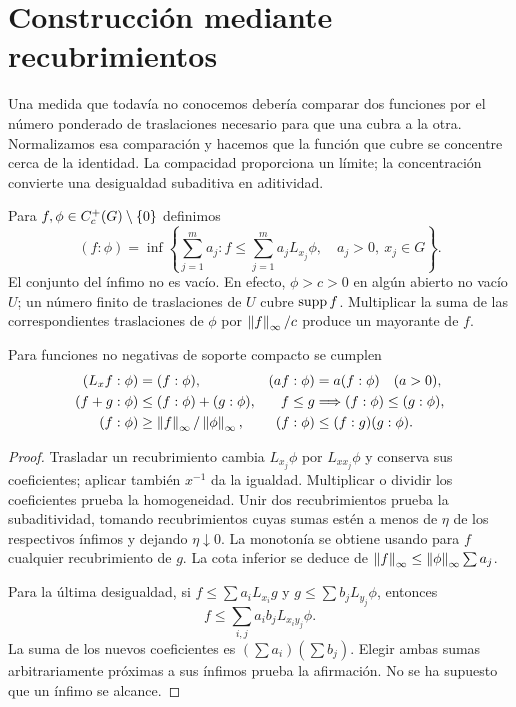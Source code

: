 \section{Construcción mediante recubrimientos}\label{lectura:v4-18}
\begin{estrategia}
Una medida que todavía no conocemos debería comparar dos funciones por el número ponderado de traslaciones necesario para que una cubra a la otra. Normalizamos esa comparación y hacemos que la función que cubre se concentre cerca de la identidad. La compacidad proporciona un límite; la concentración convierte una desigualdad subaditiva en aditividad.
\end{estrategia}

Para $f,\phi\in C_c^+(G)\setminus\{0\}$ definimos
\[
 (f:\phi)=\inf\left\{\sum_{j=1}^m a_j:
  f\leq\sum_{j=1}^m a_jL_{x_j}\phi,\quad a_j>0,\ x_j\in G\right\}.
\]
El conjunto del ínfimo no es vacío. En efecto, $\phi>c>0$ en algún abierto no vacío $U$; un número finito de traslaciones de $U$ cubre $\operatorname{supp} f$. Multiplicar la suma de las correspondientes traslaciones de $\phi$ por $\left\lVert f\right\rVert_\infty/c$ produce un mayorante de $f$.

\begin{lema}\label{v4:haar-recubrimientos}
Para funciones no negativas de soporte compacto se cumplen
\begin{align*}
 (L_xf:\phi)&=(f:\phi), & (af:\phi)&=a(f:\phi)\quad(a>0),\\
 (f+g:\phi)&\leq(f:\phi)+(g:\phi), & f\leq g&\Longrightarrow(f:\phi)\leq(g:\phi),\\
 (f:\phi)&\geq\left\lVert f\right\rVert_\infty/\left\lVert\phi\right\rVert_\infty,&
 (f:\phi)&\leq(f:g)(g:\phi).
\end{align*}
\end{lema}
\begin{proof}
Trasladar un recubrimiento cambia $L_{x_j}\phi$ por $L_{xx_j}\phi$ y conserva sus coeficientes; aplicar también $x^{-1}$ da la igualdad. Multiplicar o dividir los coeficientes prueba la homogeneidad. Unir dos recubrimientos prueba la subaditividad, tomando recubrimientos cuyas sumas estén a menos de $\eta$ de los respectivos ínfimos y dejando $\eta\downarrow0$. La monotonía se obtiene usando para $f$ cualquier recubrimiento de $g$. La cota inferior se deduce de $\left\lVert f\right\rVert_\infty\leq\left\lVert\phi\right\rVert_\infty\sum a_j$.

Para la última desigualdad, si $f\leq\sum a_iL_{x_i}g$ y $g\leq\sum b_jL_{y_j}\phi$, entonces
\[
 f\leq\sum_{i,j}a_ib_jL_{x_iy_j}\phi.
\]
La suma de los nuevos coeficientes es $(\sum a_i)(\sum b_j)$. Elegir ambas sumas arbitrariamente próximas a sus ínfimos prueba la afirmación. No se ha supuesto que un ínfimo se alcance.
\end{proof}

